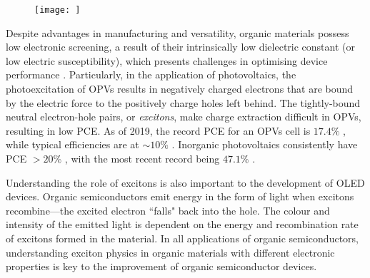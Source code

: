 \begin{figure}
    \centering
    \texttt{[image: ]}
    \caption{}
    \label{fig:intro:applications}
\end{figure}

Despite advantages in manufacturing and versatility, organic materials possess low electronic screening, a result of their intrinsically low dielectric constant (or low electric susceptibility), which presents challenges in optimising device performance \citep{gregg2003comparing}. Particularly, in the application of photovoltaics, the photoexcitation of \acp{OPV} results in negatively charged electrons that are bound by the electric force to the positively charge holes left behind. The tightly-bound neutral electron-hole pairs, or \emph{excitons}, make charge extraction difficult in \acp{OPV}, resulting in low \ac{PCE}. As of 2019, the record \ac{PCE} for an \acp{OPV} cell is $17.4\%$ \citep{Meng2018,Cui2019}, while typical efficiencies are at $\sim 10\%$ \citep{NREL2019champion}. Inorganic photovoltaics consistently have \ac{PCE} $> 20\%$ \citep{NREL2019research}, with the most recent record being $47.1\%$ \citep{Geisz2018}.


Understanding the role of excitons is also important to the development of \ac{OLED} devices. Organic semiconductors emit energy in the form of light when excitons recombine---the excited electron ``falls" back into the hole. The colour and intensity of the emitted light is dependent on the energy and recombination rate of excitons formed in the material. In all applications of organic semiconductors, understanding exciton physics in organic materials with different electronic properties is key to the improvement of organic semiconductor devices.






